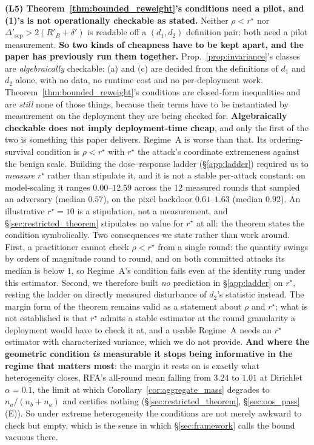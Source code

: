 \documentclass{article}
\begin{document}
\textbf{(L5) Theorem~\ref{thm:bounded_reweight}'s conditions need a pilot, and (1)'s is not operationally checkable as stated.} Neither $\rho < r^\star$ nor $\Delta'_{\mathrm{sep}} > 2(R'_B + \delta')$ is readable off a $(d_1,d_2)$ definition pair: both need a pilot measurement. \textbf{So two kinds of cheapness have to be kept apart, and the paper has previously run them together.} Prop.~\ref{prop:invariance}'s classes are \emph{algebraically} checkable: (a) and (c) are decided from the definitions of $d_1$ and $d_2$ alone, with no data, no runtime cost and no per-deployment work. Theorem~\ref{thm:bounded_reweight}'s conditions are closed-form inequalities and are \emph{still} none of those things, because their terms have to be instantiated by measurement on the deployment they are being checked for. \textbf{Algebraically checkable does not imply deployment-time cheap}, and only the first of the two is something this paper delivers. Regime~A is worse than that. Its ordering-survival condition is $\rho < r^\star$ with $r^\star$ the attack's coordinate extremeness against the benign scale. Building the dose--response ladder (§\ref{app:ladder}) required us to \emph{measure} $r^\star$ rather than stipulate it, and it is not a stable per-attack constant: on model-scaling it ranges $0.00$--$12.59$ across the 12 measured rounds that sampled an adversary (median $0.57$), on the pixel backdoor $0.61$--$1.63$ (median $0.92$). An illustrative $r^\star{=}10$ is a stipulation, not a measurement, and §\ref{sec:restricted_theorem} stipulates no value for $r^\star$ at all: the theorem states the condition symbolically. Two consequences we state rather than work around. First, a practitioner cannot check $\rho < r^\star$ from a single round: the quantity swings by orders of magnitude round to round, and on both committed attacks its median is below $1$, so Regime~A's condition fails even at the identity rung under this estimator. Second, we therefore built \emph{no} prediction in §\ref{app:ladder} on $r^\star$, resting the ladder on directly measured disturbance of $d_2$'s statistic instead. The margin form of the theorem remains valid as a statement about $\rho$ and $r^\star$; what is not established is that $r^\star$ admits a stable estimator at the round granularity a deployment would have to check it at, and a usable Regime~A needs an $r^\star$ estimator with characterized variance, which we do not provide. \textbf{And where the geometric condition \emph{is} measurable it stops being informative in the regime that matters most}: the margin it rests on is exactly what heterogeneity closes, RFA's all-round mean falling from $3.24$ to $1.01$ at Dirichlet $\alpha{=}0.1$, the limit at which Corollary~\ref{cor:aggregate_mass} degrades to $n_a/(n_b{+}n_a)$ and certifies nothing (§\ref{sec:restricted_theorem}, §\ref{sec:oos_pass}(E)). So under extreme heterogeneity the conditions are not merely awkward to check but empty, which is the sense in which §\ref{sec:framework} calls the bound vacuous there.
\end{document}
